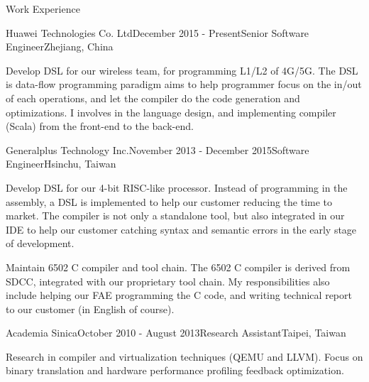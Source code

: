 \documentclass{resume} %
\begin{document}
\begin{rSection}{Work Experience}

\begin{rSubsection}{Huawei Technologies Co. Ltd}{December 2015 - Present}{Senior Software Engineer}{Zhejiang, China}
\item Develop DSL for our wireless team, for programming L1/L2 of 4G/5G. The DSL is data-flow programming paradigm aims to help programmer focus on the in/out of each operations, and let the compiler do the code generation and optimizations. I involves in the language design, and implementing compiler (Scala) from the front-end to the back-end.
\end{rSubsection}


\begin{rSubsection}{Generalplus Technology Inc.}{November 2013 - December 2015}{Software Engineer}{Hsinchu, Taiwan}
\item Develop DSL for our 4-bit RISC-like processor. Instead of programming in the assembly, a DSL is implemented to help our customer reducing the time to market. The compiler is not only a standalone tool, but also integrated in our IDE to help our customer catching syntax and semantic errors in the early stage of development.
\item Maintain 6502 C compiler and tool chain. The 6502 C compiler is derived from SDCC, integrated with our proprietary tool chain. My responsibilities also include helping our FAE programming the C code, and writing technical report to our customer (in English of course). 
\end{rSubsection}


\begin{rSubsection}{Academia Sinica}{October 2010 - August 2013}{Research Assistant}{Taipei, Taiwan}
\item Research in compiler and virtualization techniques (QEMU and LLVM). Focus on binary translation and hardware performance profiling feedback optimization.
\end{rSubsection}

\end{rSection}

\end{document}
